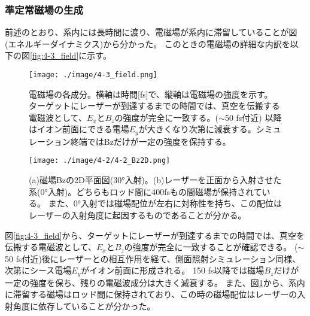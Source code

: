 \documentclass[a4paper,11pt,titlepage]{jsarticle}
\begin{document}
    \subsubsection{準定常磁場の生成}
    前述のとおり、系内には長時間に渡り、電磁場が系内に滞留していることが図(エネルギーダイナミクス)から分かった。
    このときの電磁場の詳細な内訳を以下の図\ref{fig:4-3_field}に示す。
    \begin{figure}[H]
      \begin{minipage}{0.45\hsize}
       \begin{center}
        \texttt{[image: ./image/4-3\_field.png]}
       \end{center}
       \caption{
        \label{fig:4-3_field}
        電磁場の各成分。横軸は時間[fs]で、縦軸は電磁場の強度を示す。
       ターゲットにレーザーが到達するまでの時間では、真空を伝搬する電磁波として、$E_x$と$B_z$の強度が完全に一致する。($\sim $50 fs付近)
       以降はイオン前面にできる電場$E_y$が大きくなり次第に減衰する。シミュレーション終端ではBzだけが一定の強度を保持する。}
       
      \end{minipage}
      \hfill
      \begin{minipage}{0.5\hsize}
       \begin{center}
        \texttt{[image: ./image/4-2/4-2\_Bz2D.png]}
       \end{center}
       \caption{
        \label{fig:4-2_Bz2D}  
       (a)磁場Bzの2D平面図(30°入射)。(b)レーザーを正面から入射させた系(0°入射)。どちらもロッド間に400fsもの間磁場が保持されている。
       また、0°入射では磁場配位が左右に対称性を持ち、この配位はレーザーの入射角度に起因するものであることが分かる。}
      \end{minipage}
 \end{figure}
    図\ref{fig:4-3_field}から、ターゲットにレーザーが到達するまでの時間では、真空を伝搬する電磁波として、$E_x$と$B_z$の強度が完全に一致することが確認できる。
    ($\sim $50 fs付近)後にレーザーとの相互作用を経て、側面照射シミュレーション同様、次第にシース電場$E_y$がイオン前面に形成される。
    150 fs以降では磁場$B_z$だけが一定の強度を保ち、残りの電磁波成分は大きく減衰する。
    また、図\ref{fig:4-2_Bz2D}から、系内に滞留する磁場はロッド間に保持されており、この時の磁場配位はレーザーの入射角度に依存していることが分かった。
    
\end{document}
